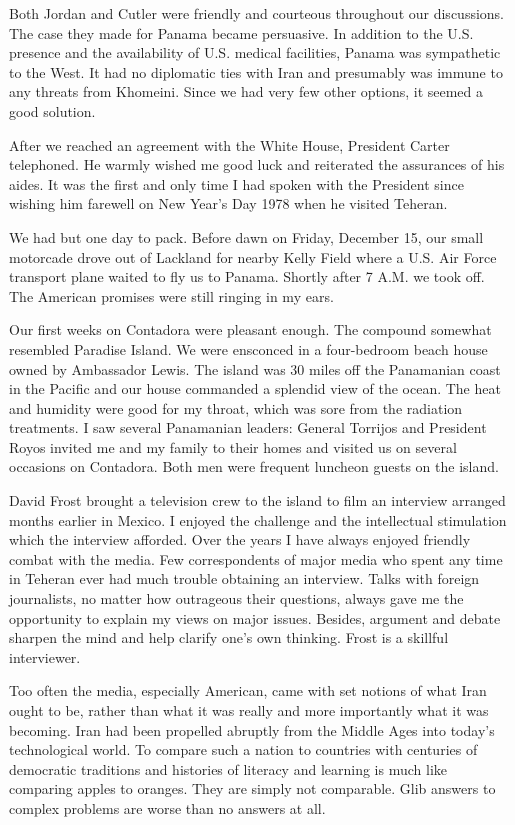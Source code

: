 Both Jordan and Cutler were friendly and courteous throughout our discussions. The case they made for Panama became persuasive. In addition to the U.S. presence and the availability of U.S. medical facilities, Panama was sympathetic to the West. It had no diplomatic ties with Iran and presumably was immune to any threats from Khomeini. Since we had very few other options, it seemed a good solution. 

After we reached an agreement with the White House, President Carter telephoned. He warmly wished me good luck and reiterated the assurances of his aides. It was the first and only time I had spoken with the President since wishing him farewell on New Year's Day 1978 when he visited Teheran. 

We had but one day to pack. Before dawn on Friday, December 15, our small motorcade drove out of Lackland for nearby Kelly Field where a U.S. Air Force transport plane waited to fly us to Panama. Shortly after 7 A.M. we took off. The American promises were still ringing in my ears. 

Our first weeks on Contadora were pleasant enough. The compound somewhat resembled Paradise Island. We were ensconced in a four-bedroom beach house owned by Ambassador Lewis. The island was 30 miles off the Panamanian coast in the Pacific and our house commanded a splendid view of the ocean. The heat and humidity were good for my throat, which was sore from the radiation treatments. I saw several Panamanian leaders: General Torrijos and President Royos invited me and my family to their homes and visited us on several occasions on Contadora. Both men were frequent luncheon guests on the island. 

David Frost brought a television crew to the island to film an interview arranged months earlier in Mexico. I enjoyed the challenge and the intellectual stimulation which the interview afforded. Over the years I have always enjoyed friendly combat with the media. Few correspondents of major media who spent any time in Teheran ever had much trouble obtaining an interview. Talks with foreign journalists, no matter how outrageous their questions, always gave me the opportunity to explain my views on major issues. Besides, argument and debate sharpen the mind and help clarify one’s own thinking. Frost is a skillful interviewer. 

Too often the media, especially American, came with set notions of what Iran ought to be, rather than what it was really and more importantly what it was becoming. Iran had been propelled abruptly from the Middle Ages into today’s technological world. To compare such a nation to countries with centuries of democratic traditions and histories of literacy and learning is much like comparing apples to oranges. They are simply not comparable. Glib answers to complex problems are worse than no answers at all. 

